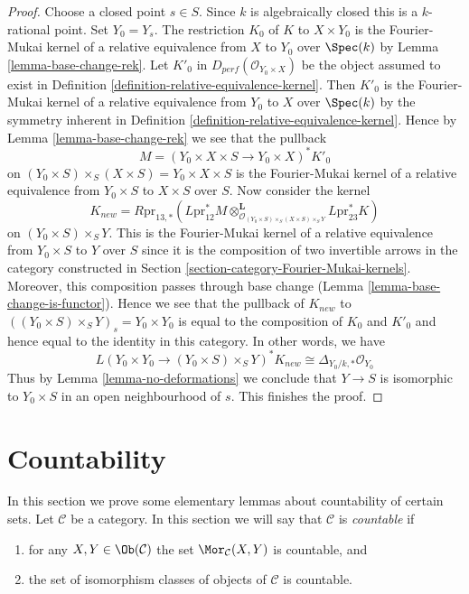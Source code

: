 \begin{proof}
Choose a closed point $s \in S$. Since $k$ is algebraically closed
this is a $k$-rational point. Set $Y_0 = Y_s$. The restriction
$K_0$ of $K$ to $X \times Y_0$ is the Fourier-Mukai kernel of a
relative equivalence from $X$ to $Y_0$ over $\Spec(k)$ by
Lemma \ref{lemma-base-change-rek}. Let $K'_0$ in
$D_{perf}(\mathcal{O}_{Y_0 \times X})$ be the 
object assumed to
exist in Definition \ref{definition-relative-equivalence-kernel}.
Then $K'_0$ is the Fourier-Mukai kernel of a
relative equivalence from $Y_0$ to $X$ over $\Spec(k)$
by the symmetry inherent in
Definition \ref{definition-relative-equivalence-kernel}.
Hence by
Lemma \ref{lemma-base-change-rek}
we see that the pullback
$$
M = (Y_0 \times X \times S \to Y_0 \times X)^*K'_0
$$
on $(Y_0 \times S) \times_S (X \times S) = Y_0 \times X \times S$
is the Fourier-Mukai kernel of a
relative equivalence from $Y_0 \times S$ to $X \times S$ over $S$.
Now consider the kernel
$$
K_{new} =
R\text{pr}_{13, *}(L\text{pr}_{12}^*M
\otimes_{\mathcal{O}_{(Y_0 \times S) \times_S (X \times S) \times_S Y}}^\mathbf{L}
L\text{pr}_{23}^*K)
$$
on $(Y_0 \times S) \times_S Y$. This is the Fourier-Mukai kernel of a
relative equivalence from $Y_0 \times S$ to $Y$ over $S$ since it is
the composition of two invertible arrows in
the category constructed in
Section \ref{section-category-Fourier-Mukai-kernels}.
Moreover, this composition passes through base change
(Lemma \ref{lemma-base-change-is-functor}).
Hence we see that the pullback of $K_{new}$ to
$((Y_0 \times S) \times_S Y)_s = Y_0 \times Y_0$
is equal to the composition of $K_0$ and $K'_0$
and hence equal to the identity in this category.
In other words, we have
$$
L(Y_0 \times Y_0 \to (Y_0 \times S) \times_S Y)^*K_{new}
\cong
\Delta_{Y_0/k, *}\mathcal{O}_{Y_0}
$$
Thus by Lemma \ref{lemma-no-deformations} we conclude that $Y \to S$
is isomorphic to $Y_0 \times S$ in an open neighbourhood of $s$.
This finishes the proof.
\end{proof}






\section{Countability}
\label{section-countability}

\noindent
In this section we prove some elementary lemmas about countability
of certain sets. Let $\mathcal{C}$ be a category. In this section
we will say that $\mathcal{C}$ is {\it countable} if
\begin{enumerate}
\item for any $X, Y \in \Ob(\mathcal{C})$ the set
$\Mor_\mathcal{C}(X, Y)$ is countable, and
\item the set of isomorphism classes of objects of $\mathcal{C}$
is countable.
\end{enumerate}

